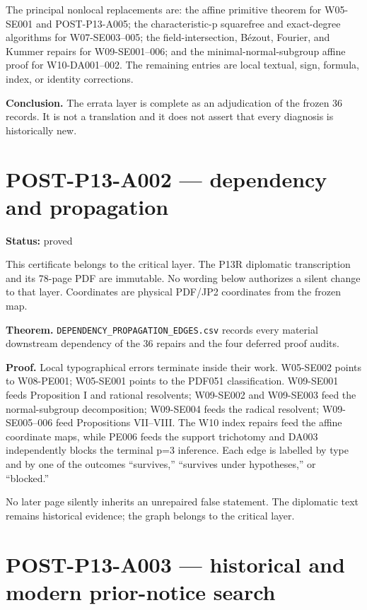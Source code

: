 \documentclass[
  10pt,
  a4paper,
]{scrreprt}
\begin{document}
The principal nonlocal replacements are: the affine primitive theorem
for W05-SE001 and POST-P13-A005; the characteristic-p squarefree and
exact-degree algorithms for W07-SE003--005; the field-intersection,
Bézout, Fourier, and Kummer repairs for W09-SE001--006; and the
minimal-normal-subgroup affine proof for W10-DA001--002. The remaining
entries are local textual, sign, formula, index, or identity
corrections.

\textbf{Conclusion.} The errata layer is complete as an adjudication of
the frozen 36 records. It is not a translation and it does not assert
that every diagnosis is historically new.

\section{POST-P13-A002 --- dependency and
propagation}\label{post-p13-a002-dependency-and-propagation}

\textbf{Status:} proved

This certificate belongs to the critical layer. The P13R diplomatic
transcription and its 78-page PDF are immutable. No wording below
authorizes a silent change to that layer. Coordinates are physical
PDF/JP2 coordinates from the frozen map.

\textbf{Theorem.} \texttt{DEPENDENCY\_PROPAGATION\_EDGES.csv} records
every material downstream dependency of the 36 repairs and the four
deferred proof audits.

\textbf{Proof.} Local typographical errors terminate inside their work.
W05-SE002 points to W08-PE001; W05-SE001 points to the PDF051
classification. W09-SE001 feeds Proposition I and rational resolvents;
W09-SE002 and W09-SE003 feed the normal-subgroup decomposition;
W09-SE004 feeds the radical resolvent; W09-SE005--006 feed Propositions
VII--VIII. The W10 index repairs feed the affine coordinate maps, while
PE006 feeds the support trichotomy and DA003 independently blocks the
terminal p=3 inference. Each edge is labelled by type and by one of the
outcomes ``survives,'' ``survives under hypotheses,'' or ``blocked.''

No later page silently inherits an unrepaired false statement. The
diplomatic text remains historical evidence; the graph belongs to the
critical layer.

\section{POST-P13-A003 --- historical and modern prior-notice
search}\label{post-p13-a003-historical-and-modern-prior-notice-search}
\end{document}
